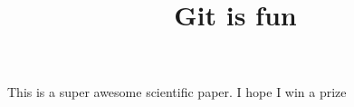 \documentclass[10pt]{article}
\title{Git is fun}
\begin{document}
		\maketitle

		This is a super awesome scientific paper.
		I hope I win a prize
\end{document}
